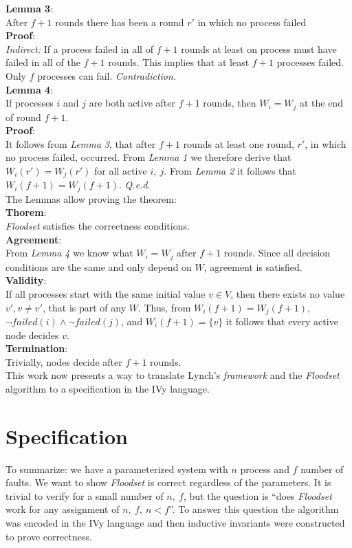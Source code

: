 \documentclass[fleqn]{article}
\begin{document}
\noindent \textbf{Lemma 3}:\\
After $f+1$ rounds there has been a round $r'$ in which no process failed\\
\textbf{Proof}:\\
\textit{Indirect:} If a process failed in all of $f+1$ rounds at least on process must have failed in all of the $f+1$ rounds. This implies
that at least $f+1$ processes failed. Only $f$ processes can fail. \textit{Contradiction}.\\


\noindent \textbf{Lemma 4}:\\
If processes $i$ and $j$ are both active after $f+1$ rounds, then $W_i = W_j$ at the end of round $f + 1$.\\
\textbf{Proof}:\\
It follows from \textit{Lemma 3}, that after $f+1$ rounds at least one round, $r'$, in which no process failed, occurred. From \textit{Lemma 1} we therefore derive that $W_i(r') = W_j(r')$ for all active $i,\ j$.
From \textit{Lemma 2} it follows that $W_i(f+1) = W_j(f+1)$. \textit{Q.e.d}.\\

\noindent The Lemmas allow proving the theorem:\\
\noindent \textbf{Thorem}:\\
\textit{Floodset} satisfies the correctness conditions.\\
\textbf{Agreement}:\\
From \textit{Lemma 4} we know what $W_i = W_j$ after $f+1$ rounds. Since all decision conditions are the same and only depend on $W$, agreement is satisfied.\\
\textbf{Validity}:\\
If all processes start with the same initial value $v \in V$, then there exists no value $v', v \neq v'$, that is part of any $W$. Thus, from $W_i(f+1) = W_j(f+1)$, $\neg failed(i) \land \neg failed(j)$, and $W_i(f+1) = \{v\}$ it follows
that every active node decides $v$.\\
\textbf{Termination}:\\
Trivially, nodes decide after $f+1$ rounds.\\

This work now presents a way to translate Lynch's \textit{framework} and the \textit{Floodset} algorithm to a specification in the IVy language.

\section{Specification}
To summarize: we have a parameterized system with $n$ process and $f$ number of faults. We want to show \textit{Floodset} is correct regardless of the parameters.
It is trivial to verify for a small number of $n,\ f$, but the question is ``does \textit{Floodset} work for any assignment of $n,\ f,\ n < f$''.
To answer this question the algorithm was encoded in the IVy language and then inductive invariants were constructed to prove correctness.
\end{document}
